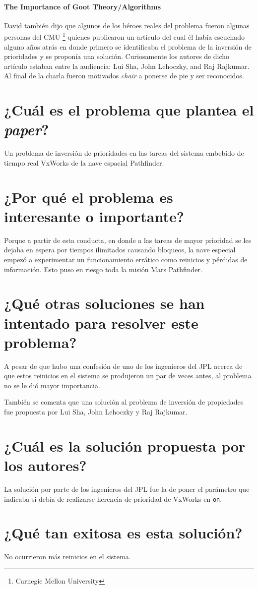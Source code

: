 \paragraph{\textnormal{\textbf{The Importance of Goot Theory/Algorithms}}}
David también dijo que algunos de los héroes reales del problema fueron algunas personas del CMU \footnote{Carnegie Mellon University} quienes publicaron un artículo del cual él había escuchado  alguno años atrás en donde primero se identificaba el problema de la inversión de prioridades y se proponía una solución. Curiosamente los autores de dicho artículo estaban entre la audiencia: Lui Sha, John Lehoczky, and Raj Rajkumar. Al final de la charla fueron motivados \textit{chair} a ponerse de pie y ser reconocidos.




\section{¿Cuál es el problema que plantea el \textit{paper}?}
Un problema de inversión de prioridades en las tareas del sistema embebido de tiempo real VxWorks de la nave espacial Pathfinder.

\section{¿Por qué el problema es interesante o importante?}
Porque a partir de esta conducta, en donde a las tareas de mayor prioridad se les dejaba en espera por tiempos ilimitados causando bloqueos, la nave especial empezó a experimentar un funcionamiento errático como reinicios y pérdidas de información. Esto puso en riesgo toda la misión Mars Pathfinder.

\section{¿Qué otras soluciones se han intentado para resolver este problema?}
A pesar de que hubo una confesión de uno de los ingenieros del JPL acerca de que estos reinicios en el sistema se produjeron un par de veces antes, al problema no se le dió mayor importancia.

También se comenta que una solución al problema de inversión de propiedades fue propuesta por Lui Sha, John Lehoczky y Raj Rajkumar.

     
\section{¿Cuál es la solución propuesta por los autores?}
La solución por parte de los ingenieros del JPL fue la de poner el parámetro que indicaba si debía de realizarse herencia de prioridad de VxWorks en \texttt{on}.

\section{¿Qué tan exitosa es esta solución?} 
No ocurrieron más reinicios en el sistema.